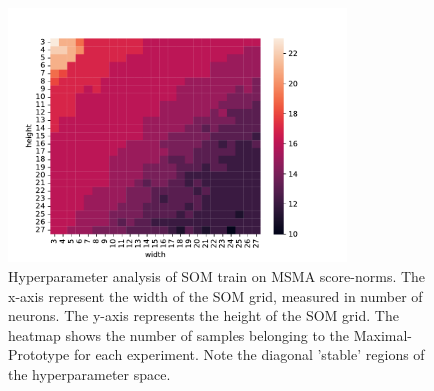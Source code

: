 \begin{figure}[tbhp]
\centering
\includegraphics[width=0.8\textwidth]{figures/som_stability.pdf}
\caption{Hyperparameter analysis of SOM train on MSMA score-norms. The x-axis represent the width of the SOM grid, measured in number of neurons. The y-axis represents the height of the SOM grid. The heatmap shows the number of samples belonging to the Maximal-Prototype for each experiment. Note the diagonal 'stable' regions of the hyperparameter space.}
\label{fig:som-hparams}
\end{figure}



